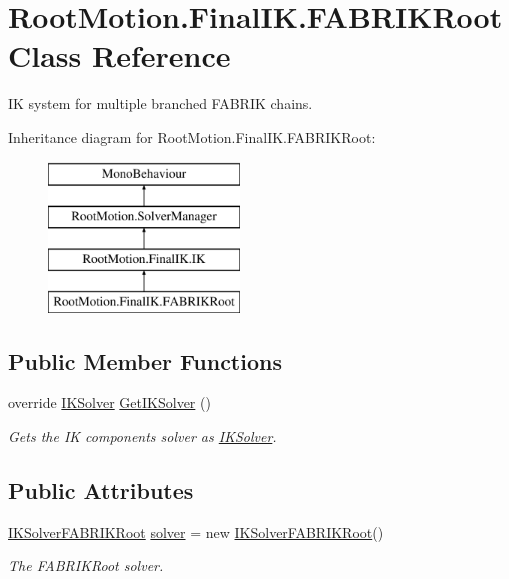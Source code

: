 \hypertarget{class_root_motion_1_1_final_i_k_1_1_f_a_b_r_i_k_root}{}\section{Root\+Motion.\+Final\+I\+K.\+F\+A\+B\+R\+I\+K\+Root Class Reference}
\label{class_root_motion_1_1_final_i_k_1_1_f_a_b_r_i_k_root}


IK system for multiple branched F\+A\+B\+R\+IK chains.  


Inheritance diagram for Root\+Motion.\+Final\+I\+K.\+F\+A\+B\+R\+I\+K\+Root\+:\begin{figure}[H]
\begin{center}
\leavevmode
\includegraphics[height=4.000000cm]{class_root_motion_1_1_final_i_k_1_1_f_a_b_r_i_k_root}
\end{center}
\end{figure}
\subsection*{Public Member Functions}
\begin{DoxyCompactItemize}
\item 
override \mbox{\hyperlink{class_root_motion_1_1_final_i_k_1_1_i_k_solver}{I\+K\+Solver}} \mbox{\hyperlink{class_root_motion_1_1_final_i_k_1_1_f_a_b_r_i_k_root_a3bc8f9e7db9f8eafb22c95530f2a9f7c}{Get\+I\+K\+Solver}} ()
\begin{DoxyCompactList}\small\item\em Gets the IK component\textquotesingle{}s solver as \mbox{\hyperlink{class_root_motion_1_1_final_i_k_1_1_i_k_solver}{I\+K\+Solver}}. \end{DoxyCompactList}\end{DoxyCompactItemize}
\subsection*{Public Attributes}
\begin{DoxyCompactItemize}
\item 
\mbox{\hyperlink{class_root_motion_1_1_final_i_k_1_1_i_k_solver_f_a_b_r_i_k_root}{I\+K\+Solver\+F\+A\+B\+R\+I\+K\+Root}} \mbox{\hyperlink{class_root_motion_1_1_final_i_k_1_1_f_a_b_r_i_k_root_a8206d9a7baeb0a059e7d3232a1b03110}{solver}} = new \mbox{\hyperlink{class_root_motion_1_1_final_i_k_1_1_i_k_solver_f_a_b_r_i_k_root}{I\+K\+Solver\+F\+A\+B\+R\+I\+K\+Root}}()
\begin{DoxyCompactList}\small\item\em The F\+A\+B\+R\+I\+K\+Root solver. \end{DoxyCompactList}\end{DoxyCompactItemize}
